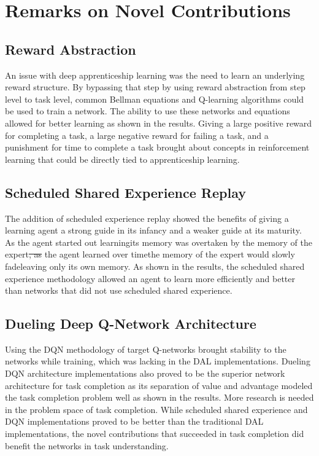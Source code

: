 \documentclass[12pt,american]{report}
\providecommand{\DIFaddtex}[1]{{\protect\color{blue}\uwave{#1}}} %
\providecommand{\DIFdeltex}[1]{{\protect\color{red}\sout{#1}}}                      %
\providecommand{\DIFaddbegin}{} %
\providecommand{\DIFaddend}{} %
\providecommand{\DIFdelbegin}{} %
\providecommand{\DIFdelend}{} %
\providecommand{\DIFadd}[1]{\texorpdfstring{\DIFaddtex{#1}}{#1}} %
\providecommand{\DIFdel}[1]{\texorpdfstring{\DIFdeltex{#1}}{}} %
\newcommand{\DIFscaledelfig}{0.5}
\newlength{\DIFdelgraphicswidth} %
\newlength{\DIFdelgraphicsheight} %
\newcommand{\DIFaddincludegraphics}[2][]{{\color{blue}\fbox{\DIFOincludegraphics[#1]{#2}}}} %
\newcommand{\DIFdelincludegraphics}[2][]{%
\sbox{\DIFdelgraphicsbox}{\DIFOincludegraphics[#1]{#2}}%
\settoboxwidth{\DIFdelgraphicswidth}{\DIFdelgraphicsbox} %
\settoboxtotalheight{\DIFdelgraphicsheight}{\DIFdelgraphicsbox} %
\scalebox{\DIFscaledelfig}{%
\parbox[b]{\DIFdelgraphicswidth}{\usebox{\DIFdelgraphicsbox}\\[-\baselineskip] \rule{\DIFdelgraphicswidth}{0em}}\llap{\resizebox{\DIFdelgraphicswidth}{\DIFdelgraphicsheight}{%
\setlength{\unitlength}{\DIFdelgraphicswidth}%
\begin{picture}(1,1)%
\thicklines\linethickness{2pt} %
{\color[rgb]{1,0,0}\put(0,0){\framebox(1,1){}}}%
{\color[rgb]{1,0,0}\put(0,0){\line( 1,1){1}}}%
{\color[rgb]{1,0,0}\put(0,1){\line(1,-1){1}}}%
\end{picture}%
}\hspace*{3pt}}} %
} %
\DeclareRobustCommand{\DIFaddbegin}{\DIFOaddbegin \let\includegraphics\DIFaddincludegraphics} %
\DeclareRobustCommand{\DIFaddend}{\DIFOaddend \let\includegraphics\DIFOincludegraphics} %
\DeclareRobustCommand{\DIFdelbegin}{\DIFOdelbegin \let\includegraphics\DIFdelincludegraphics} %
\DeclareRobustCommand{\DIFdelend}{\DIFOaddend \let\includegraphics\DIFOincludegraphics} %
\begin{document}
\section{Remarks on Novel Contributions}
\subsection{Reward Abstraction}
An issue with deep apprenticeship learning was the need to learn an underlying reward structure.  By bypassing that step by using reward abstraction from step level to task level, common Bellman equations and Q-learning algorithms could be used to train a network.  The ability to use these networks and equations allowed for better learning as shown in the results.  Giving a large positive reward for completing a task, a large negative reward for failing a task, and a punishment for time to complete a task brought about concepts in reinforcement learning that could be directly tied to apprenticeship learning.

\subsection{Scheduled Shared Experience Replay}
The addition of scheduled experience replay showed the benefits of giving a learning agent a strong guide in its infancy and a weaker guide at its maturity.  As the agent started out learning\DIFaddbegin \DIFadd{, }\DIFaddend its memory was overtaken by the memory of the expert\DIFdelbegin \DIFdel{, as }\DIFdelend \DIFaddbegin \DIFadd{. As }\DIFaddend the agent learned over time\DIFaddbegin \DIFadd{, }\DIFaddend the memory of the expert would slowly fade\DIFaddbegin \DIFadd{, }\DIFaddend leaving only its own memory.  As shown in the results, the scheduled shared experience methodology allowed an agent to learn more efficiently and better than networks that did not use scheduled shared experience.

\subsection{Dueling Deep Q-Network Architecture}
Using the DQN methodology of target Q-networks brought stability to the networks while training, which was lacking in the DAL implementations.  Dueling DQN architecture implementations also proved to be the superior network architecture for task completion as its separation of value and advantage modeled the task completion problem well as shown in the results. More research is needed in the problem space of task completion.  While scheduled shared experience and DQN implementations proved to be better than the traditional DAL implementations, the novel contributions that succeeded in task completion did benefit the networks in task understanding.
\end{document}
